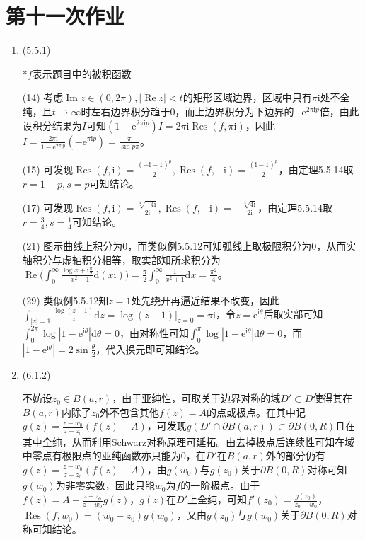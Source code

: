\documentclass[a4paper,UTF8,fontset=windows]{ctexart}
\DeclareMathOperator{\im}{Im}
\DeclareMathOperator{\re}{Re}
\DeclareMathOperator{\Res}{Res}
\begin{document}
\section{第十一次作业}
\begin{enumerate}
    \item (5.5.1)
    
    *$f$表示题目中的被积函数
    
    (14) 考虑$\im z\in(0,2\pi),|\re z|<t$的矩形区域边界，区域中只有$\pi\mathrm{i}$处不全纯，且$t\to\infty$时左右边界积分趋于0，而上边界积分为下边界的$-\mathrm{e}^{2\pi\mathrm{i}p}$倍，由此设积分结果为$I$可知$(1-\mathrm{e}^{2\pi\mathrm{i}p})I=2\pi\mathrm{i}\Res(f,\pi\mathrm{i})$，因此$I=\frac{2\pi\mathrm{i}}{1-\mathrm{e}^{2\pi\mathrm{i}p}}(-\mathrm{e}^{\pi\mathrm{i}p})=\frac{\pi}{\sin{p\pi}}$。
    
    (15) 可发现$\Res(f,\mathrm{i})=\frac{(-\mathrm{i}-1)^p}{2},\Res(f,-\mathrm{i})=\frac{(\mathrm{i}-1)^p}{2}$，由定理5.5.14取$r=1-p,s=p$可知结论。
    
    (17) 可发现$\Res(f,\mathrm{i})=\frac{\sqrt[4]{-4\mathrm{i}}}{2\mathrm{i}},\Res(f,-\mathrm{i})=-\frac{\sqrt[4]{4\mathrm{i}}}{2\mathrm{i}}$，由定理5.5.14取$r=\frac{3}{4},s=\frac{1}{4}$可知结论。
    
    (21) 图示曲线上积分为0，而类似例5.5.12可知弧线上取极限积分为0，从而实轴积分与虚轴积分相等，取实部知所求积分为$\re\big(\int_0^\infty\frac{\log x+\mathrm{i}\frac{\pi}{2}}{-x^2-1}\mathrm{d}(x\mathrm{i})\big)=\frac{\pi}{2}\int_0^\infty\frac{1}{x^2+1}\mathrm{d}x=\frac{\pi^2}{4}$。
    
    (29) 类似例5.5.12知$z=1$处先绕开再逼近结果不改变，因此$\int_{|z|=1}\frac{\log(z-1)}{z}\mathrm{d}z=\log(z-1)\big|_{z=0}=\pi\mathrm{i}$，令$z=\mathrm{e}^{\mathrm{i}\theta}$后取实部可知$\int_0^{2\pi}\log|1-\mathrm{e}^{\mathrm{i}\theta}|\mathrm{d}\theta=0$，由对称性可知$\int_0^\pi\log|1-\mathrm{e}^{\mathrm{i}\theta}|\mathrm{d}\theta=0$，而$|1-\mathrm{e}^{\mathrm{i}\theta}|=2\sin\frac{\theta}{2}$，代入换元即可知结论。
    
    \item (6.1.2)
    
    不妨设$z_0\in B(a,r)$，由于亚纯性，可取关于边界对称的域$D'\subset D$使得其在$B(a,r)$内除了$z_0$外不包含其他$f(z)=A$的点或极点。在其中记$g(z)=\frac{z-w_0}{z-z_0}(f(z)-A)$，可发现$g(D'\cap\partial B(a,r))\subset\partial B(0,R)$且在其中全纯，从而利用Schwarz对称原理可延拓。由去掉极点后连续性可知在域中零点有极限点的亚纯函数亦只能为0，在$D'$在$B(a,r)$外的部分仍有$g(z)=\frac{z-w_0}{z-z_0}(f(z)-A)$，由$g(w_0)$与$g(z_0)$关于$\partial B(0,R)$对称可知$g(w_0)$为非零实数，因此只能$w_0$为$f$的一阶极点。由于$f(z)=A+\frac{z-z_0}{z-w_0}g(z)$，$g(z)$在$D'$上全纯，可知$f'(z_0)=\frac{g(z_0)}{z_0-w_0}$，$\Res(f,w_0)=(w_0-z_0)g(w_0)$，又由$g(z_0)$与$g(w_0)$关于$\partial B(0,R)$对称可知结论。
    

\end{enumerate}
\end{document}
